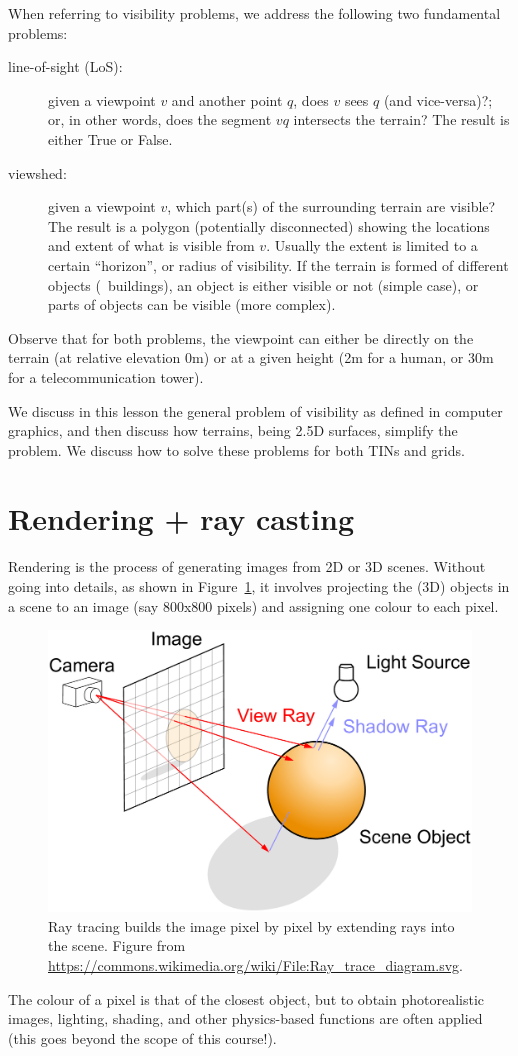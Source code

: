 %

When referring to visibility problems, we address the following two fundamental problems:
\begin{description}
  \item[line-of-sight (LoS):] given a viewpoint $v$ and another point $q$, does $v$ sees $q$ (and vice-versa)?; or, in other words, does the segment $vq$ intersects the terrain? The result is either True or False.
  \item[viewshed:] given a viewpoint $v$, which part(s) of the surrounding terrain are visible? The result is a polygon (potentially disconnected) showing the locations and extent of what is visible from $v$. Usually the extent is limited to a certain ``horizon'', or radius of visibility. If the terrain is formed of different objects (\eg\ buildings), an object is either visible or not (simple case), or parts of objects can be visible (more complex).
\end{description}
Observe that for both problems, the viewpoint can either be directly on the terrain (at relative elevation 0m) or at a given height (2m for a human, or 30m for a telecommunication tower).

%

We discuss in this lesson the general problem of visibility as defined in computer graphics, and then discuss how terrains, being 2.5D surfaces, simplify the problem.
We discuss how to solve these problems for both TINs and grids.




%
\section{Rendering + ray casting}

Rendering is the process of generating images from 2D or 3D scenes.
Without going into details, as shown in Figure~\ref{fig:Ray_trace_diagram}, it involves projecting the (3D) objects in a scene to an image (say 800x800 pixels) and assigning one colour to each pixel.
\begin{figure}
  \centering
  \includegraphics[width=0.6\linewidth]{figs/Ray_trace_diagram.pdf}
  \caption{Ray tracing builds the image pixel by pixel by extending rays into the scene. Figure from \url{https://commons.wikimedia.org/wiki/File:Ray_trace_diagram.svg}.}
\label{fig:Ray_trace_diagram}
\end{figure}
The colour of a pixel is that of the closest object, but to obtain photorealistic images, lighting, shading, and other physics-based functions are often applied (this goes beyond the scope of this course!).

